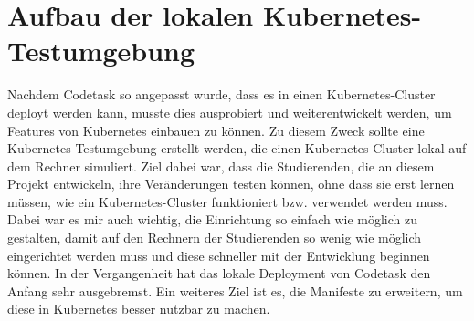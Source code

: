 \section{Aufbau der lokalen Kubernetes-Testumgebung}

Nachdem Codetask so angepasst wurde, dass es in einen Kubernetes-Cluster deployt werden kann, musste dies ausprobiert und weiterentwickelt werden, um Features von Kubernetes einbauen zu können.
Zu diesem Zweck sollte eine Kubernetes-Testumgebung erstellt werden, die einen Kubernetes-Cluster lokal auf dem Rechner simuliert.
Ziel dabei war, dass die Studierenden, die an diesem Projekt entwickeln, ihre Veränderungen testen können, ohne dass sie erst lernen müssen, wie ein Kubernetes-Cluster funktioniert bzw. verwendet werden muss.
Dabei war es mir auch wichtig, die Einrichtung so einfach wie möglich zu gestalten, damit auf den Rechnern der Studierenden so wenig wie möglich eingerichtet werden muss und diese schneller mit der Entwicklung beginnen können.
In der Vergangenheit hat das lokale Deployment von Codetask den Anfang sehr ausgebremst.
Ein weiteres Ziel ist es, die Manifeste zu erweitern, um diese in Kubernetes besser nutzbar zu machen.




